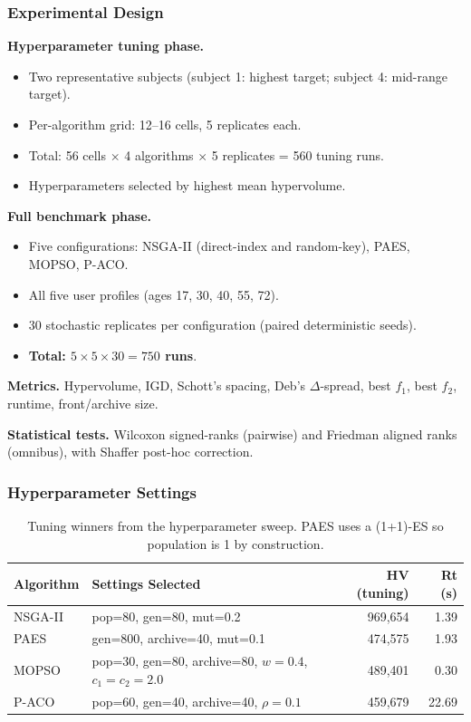 \documentclass[aspectratio=169,10pt]{beamer}
\begin{document}
\begin{frame}
\frametitle{Experimental Design}

\textbf{Hyperparameter tuning phase.}
\begin{itemize}
  \item Two representative subjects (subject 1: highest target; subject 4: mid-range target).
  \item Per-algorithm grid: 12--16 cells, 5 replicates each.
  \item Total: 56 cells $\times$ 4 algorithms $\times$ 5 replicates = 560 tuning runs.
  \item Hyperparameters selected by highest mean hypervolume.
\end{itemize}

\vspace{0.3cm}

\textbf{Full benchmark phase.}
\begin{itemize}
  \item Five configurations: NSGA-II (direct-index and random-key), PAES, MOPSO, P-ACO.
  \item All five user profiles (ages 17, 30, 40, 55, 72).
  \item 30 stochastic replicates per configuration (paired deterministic seeds).
  \item \textbf{Total: $5 \times 5 \times 30 = 750$ runs}.
\end{itemize}

\vspace{0.3cm}

\textbf{Metrics.} Hypervolume, IGD, Schott's spacing, Deb's $\Delta$-spread, best $f_1$, best $f_2$, runtime, front/archive size.

\textbf{Statistical tests.} Wilcoxon signed-ranks (pairwise) and Friedman aligned ranks (omnibus), with Shaffer post-hoc correction.

\end{frame}

\begin{frame}
\frametitle{Hyperparameter Settings}

\begin{table}
\centering\small
\begin{tabular}{llrr}
\toprule
\textbf{Algorithm} & \textbf{Settings Selected} & \textbf{HV (tuning)} & \textbf{Rt (s)} \\
\midrule
NSGA-II & pop=80, gen=80, mut=0.2 & 969,654 & 1.39 \\
PAES & gen=800, archive=40, mut=0.1 & 474,575 & 1.93 \\
MOPSO & pop=30, gen=80, archive=80, $w=0.4$, $c_1=c_2=2.0$ & 489,401 & 0.30 \\
P-ACO & pop=60, gen=40, archive=40, $\rho=0.1$ & 459,679 & 22.69 \\
\bottomrule
\end{tabular}
\caption{Tuning winners from the hyperparameter sweep. PAES uses a (1+1)-ES so population is 1 by construction.}
\end{table}

\end{frame}
\end{document}
